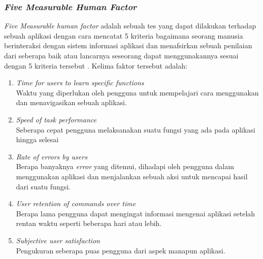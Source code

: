 \documentclass[a4paper]{article}
\newcommand{\subsubbab}[1]{%
    \subsubsection{#1}%
}
\begin{document}
\subsubbab{\textit{Five Measurable Human Factor}}
\textit{Five Measurable human factor} adalah sebuah tes yang dapat dilakukan terhadap sebuah aplikasi dengan cara mencatat 5 kriteria bagaimana seorang manusia berinteraksi dengan sistem informasi aplikasi dan menafsirkan sebuah penilaian dari seberapa baik atau lancarnya seseorang dapat menggunakannya sesuai dengan 5 kriteria tersebut \autocite{Shneiderman_Plaisant_Cohen_Jacobs_Elmqvist_2018_5_factors}. Kelima faktor tersebut adalah:
\begin{enumerate}
    \item \textit{Time for users to learn specific functions}\\
    Waktu yang diperlukan oleh pengguna untuk mempelajari cara menggunakan dan menavigasikan sebuah aplikasi.
    \item \textit{Speed of task performance}\\
    Seberapa cepat pengguna melaksanakan suatu fungsi yang ada pada aplikasi hingga selesai
    \item \textit{Rate of errors by users}\\
    Berapa banyaknya \textit{error} yang ditemui, dihadapi oleh pengguna dalam menggunakan aplikasi dan menjalankan sebuah aksi untuk mencapai hasil dari suatu fungsi.
    \item \textit{User retention of commands over time}\\
    Berapa lama pengguna dapat mengingat informasi mengenai aplikasi setelah rentan waktu seperti beberapa hari atau lebih.
    \item \textit{Subjective user satisfaction}\\
    Pengukuran seberapa puas pengguna dari aspek manapun aplikasi.
\end{enumerate}
\end{document}
